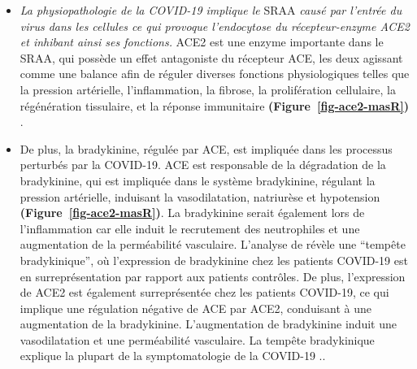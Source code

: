 \documentclass[
  a4paper,
  DIV=11,
  numbers=noendperiod,
  listof=totoc]{scrreprt}
\begin{document}
\begin{itemize}
\item
  \emph{La physiopathologie de la COVID-19 implique le} \ac{SRAA}
  \emph{causé par l'entrée du virus dans les cellules ce qui provoque
  l'endocytose du récepteur-enzyme ACE2 et inhibant ainsi ses
  fonctions.} ACE2 est une enzyme importante dans le \ac{SRAA}, qui
  possède un effet antagoniste du récepteur ACE, les deux agissant comme
  une balance afin de réguler diverses fonctions physiologiques telles
  que la pression artérielle, l'inflammation, la fibrose, la
  prolifération cellulaire, la régénération tissulaire, et la réponse
  immunitaire \textbf{(Figure~\ref{fig-ace2-masR})}
  \autocite{Brojakowska.2020}.
\item
  De plus, la bradykinine, régulée par ACE, est impliquée dans les
  processus perturbés par la COVID-19. ACE est responsable de la
  dégradation de la bradykinine, qui est impliquée dans le système
  bradykinine, régulant la pression artérielle, induisant la
  vasodilatation, natriurèse et hypotension
  \textbf{(Figure~\ref{fig-ace2-masR})}. La bradykinine serait également
  lors de l'inflammation car elle induit le recrutement des neutrophiles
  et une augmentation de la perméabilité vasculaire. L'analyse de
  \textcite{Garvin.2020} révèle une ``tempête bradykinique'', où
  l'expression de bradykinine chez les patients COVID-19 est en
  surreprésentation par rapport aux patients contrôles. De plus,
  l'expression de ACE2 est également surreprésentée chez les patients
  COVID-19, ce qui implique une régulation négative de ACE par ACE2,
  conduisant à une augmentation de la bradykinine. L'augmentation de
  bradykinine induit une vasodilatation et une perméabilité vasculaire.
  La tempête bradykinique explique la plupart de la symptomatologie de
  la COVID-19 \autocite{Garvin.2020}..
\end{itemize}
\end{document}

